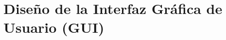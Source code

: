 \documentclass[a4paper,12pt]{article}
\begin{document}
    \section{Diseño de la Interfaz Gráfica de Usuario (GUI)}\label{sec:diseno-de-la-interfaz-grafica-de-usuario-(gui)}
    
%
%
%
%
%
%
%
%
%
%
\end{document}
